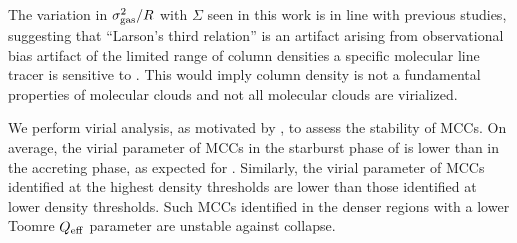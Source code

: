 \IfFileExists{emulateapjlegacy.cls}{\documentclass[iop]{emulateapjlegacy}}{\documentclass[iop]{emulateapj}}
\begin{document}

The variation in $\sigma_{\rm gas}^2/R$ with $\Sigma$ seen in this work is in line with previous studies, suggesting that ``Larson's third relation'' is an artifact arising from observational bias artifact of the limited range of  column densities a specific molecular line tracer is sensitive to \citep[][]{Ballesteros02a, Ballesteros11a}. This would imply column density is not a fundamental properties of molecular clouds and not all molecular clouds are virialized. 

We perform virial analysis, as motivated by \obs, to assess the stability of MCCs. On average, the virial parameter of MCCs in the starburst phase of \flower is lower than in the accreting phase, as expected for \SF. Similarly, the virial parameter of MCCs identified at the highest density thresholds are lower than those identified at lower density thresholds. Such MCCs identified in the denser regions with a lower Toomre $Q_{\rm eff}$ parameter are unstable against collapse.
\end{document}

